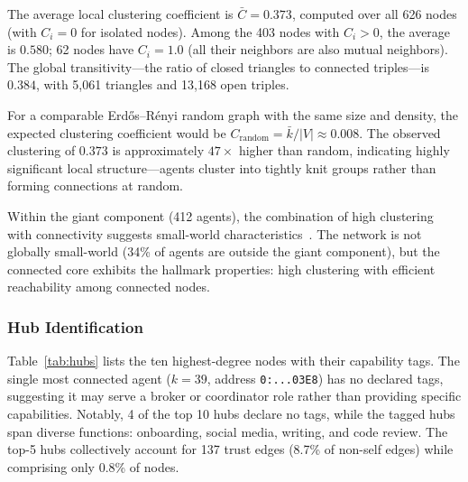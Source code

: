 \documentclass[11pt,twocolumn]{article}
\begin{document}
The average local clustering coefficient is $\bar{C} = 0.373$, computed over all 626 nodes (with $C_i = 0$ for isolated nodes). Among the 403 nodes with $C_i > 0$, the average is $0.580$; 62 nodes have $C_i = 1.0$ (all their neighbors are also mutual neighbors). The global transitivity---the ratio of closed triangles to connected triples---is $0.384$, with 5,061 triangles and 13,168 open triples.

For a comparable Erd\H{o}s--R\'{e}nyi random graph with the same size and density, the expected clustering coefficient would be $C_{\text{random}} = \bar{k}/|V| \approx 0.008$. The observed clustering of $0.373$ is approximately $47\times$ higher than random, indicating highly significant local structure---agents cluster into tightly knit groups rather than forming connections at random.

Within the giant component (412 agents), the combination of high clustering with connectivity suggests small-world characteristics~\citep{watts1998collective}. The network is not globally small-world (34\% of agents are outside the giant component), but the connected core exhibits the hallmark properties: high clustering with efficient reachability among connected nodes.

\subsubsection{Hub Identification}

Table~\ref{tab:hubs} lists the ten highest-degree nodes with their capability tags. The single most connected agent ($k=39$, address \texttt{0:...03E8}) has no declared tags, suggesting it may serve a broker or coordinator role rather than providing specific capabilities. Notably, 4 of the top 10 hubs declare no tags, while the tagged hubs span diverse functions: onboarding, social media, writing, and code review. The top-5 hubs collectively account for 137 trust edges (8.7\% of non-self edges) while comprising only 0.8\% of nodes.
\end{document}
